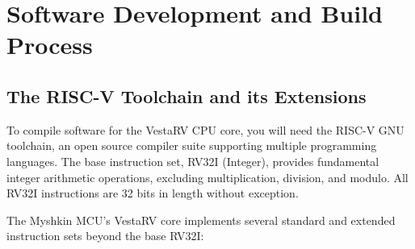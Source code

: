 \documentclass[11pt,pdftex,portrait,letterpaper]{article}
\begin{document}
\section{Software Development and Build Process} \label{s:software}

\subsection{The RISC-V Toolchain and its Extensions}
To compile software for the VestaRV CPU core, you will need the RISC-V GNU toolchain, an open source compiler suite supporting multiple programming languages. The base instruction set, RV32I (Integer), provides fundamental integer arithmetic operations, excluding multiplication, division, and modulo. All RV32I instructions are 32 bits in length without exception.

The Myshkin MCU's VestaRV core implements several standard and extended instruction sets beyond the base RV32I:
\end{document}
